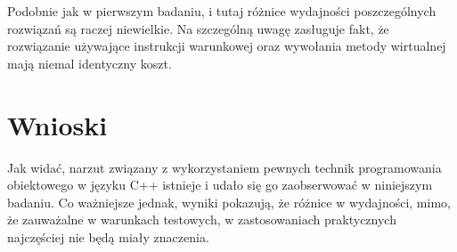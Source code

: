 \documentclass{article}
\begin{document}
Podobnie jak w pierwszym badaniu, i tutaj różnice wydajności poszczególnych rozwiązań są raczej niewielkie. Na szczególną uwagę zasługuje fakt, że rozwiązanie używające instrukcji warunkowej oraz wywołania metody wirtualnej mają niemal identyczny koszt.

\section{Wnioski}
Jak widać, narzut związany z wykorzystaniem pewnych technik programowania obiektowego w języku C++ istnieje i udało się go zaobserwować w niniejszym badaniu. Co ważniejsze jednak, wyniki pokazują, że różnice w wydajności, mimo, że zauważalne w warunkach testowych, w zastosowaniach praktycznych najczęściej nie będą miały znaczenia.
\end{document}
